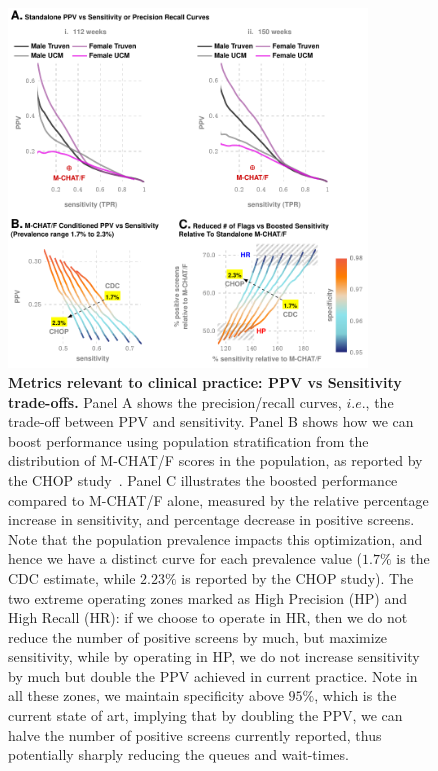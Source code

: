 \documentclass[3p,super,numbers,sort&compress,preprint,10pt]{elsarticle}
\renewcommand{\captionN}[1]{\caption{ #1  }}
\newif\iftikzX
\begin{document}
\begin{figure}[!ht]
  \tikzexternalenable
  \vspace{-10pt}

  \centering
  
  \def\AXISCOL{white}
  \def\TEXTCOL{gray}
  \iftikzX
  
  \else
  \includegraphics[width=0.85\textwidth]{Figures/External/perfC.pdf}
  \fi
  \vspace{-10pt}

  \captionN{\textbf{Metrics relevant to clinical practice: PPV vs Sensitivity trade-offs.} Panel A shows the precision/recall curves, $i.e.$,  the trade-off between PPV and sensitivity. Panel B shows how we can boost performance using population stratification from the distribution of M-CHAT/F scores in the population, as reported by the CHOP study~\cite{pmid31562252}. Panel C illustrates the boosted performance compared to M-CHAT/F alone,
    measured by the relative percentage increase in sensitivity, and percentage decrease in positive screens. Note that the population prevalence impacts this optimization, and hence  we have  a distinct  curve for each prevalence value ($1.7\%$ is the CDC estimate, while $2.23\%$ is reported by the CHOP study).  The two extreme operating zones marked as High Precision (HP) and High Recall (HR): if we choose to operate in HR, then we do not reduce the number of positive screens by much, but maximize sensitivity, while by operating in HP, we do not increase sensitivity by much but double the PPV achieved in current practice. Note in all these zones, we maintain specificity above $95\%$, which is the current state of art, implying that by doubling the PPV, we can halve the number of positive screens currently reported, thus potentially sharply reducing the queues and wait-times. }\label{figprc}
\end{figure}
\end{document}

